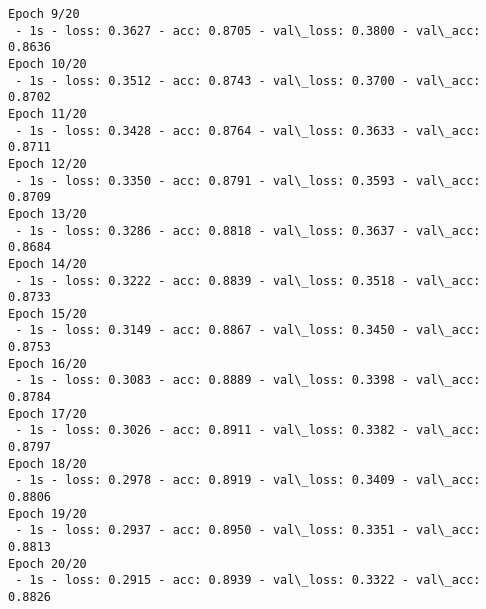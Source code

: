 \documentclass[11pt]{article}
\begin{document}
\begin{Verbatim}[commandchars=\\\{\}]
Epoch 9/20
 - 1s - loss: 0.3627 - acc: 0.8705 - val\_loss: 0.3800 - val\_acc: 0.8636
Epoch 10/20
 - 1s - loss: 0.3512 - acc: 0.8743 - val\_loss: 0.3700 - val\_acc: 0.8702
Epoch 11/20
 - 1s - loss: 0.3428 - acc: 0.8764 - val\_loss: 0.3633 - val\_acc: 0.8711
Epoch 12/20
 - 1s - loss: 0.3350 - acc: 0.8791 - val\_loss: 0.3593 - val\_acc: 0.8709
Epoch 13/20
 - 1s - loss: 0.3286 - acc: 0.8818 - val\_loss: 0.3637 - val\_acc: 0.8684
Epoch 14/20
 - 1s - loss: 0.3222 - acc: 0.8839 - val\_loss: 0.3518 - val\_acc: 0.8733
Epoch 15/20
 - 1s - loss: 0.3149 - acc: 0.8867 - val\_loss: 0.3450 - val\_acc: 0.8753
Epoch 16/20
 - 1s - loss: 0.3083 - acc: 0.8889 - val\_loss: 0.3398 - val\_acc: 0.8784
Epoch 17/20
 - 1s - loss: 0.3026 - acc: 0.8911 - val\_loss: 0.3382 - val\_acc: 0.8797
Epoch 18/20
 - 1s - loss: 0.2978 - acc: 0.8919 - val\_loss: 0.3409 - val\_acc: 0.8806
Epoch 19/20
 - 1s - loss: 0.2937 - acc: 0.8950 - val\_loss: 0.3351 - val\_acc: 0.8813
Epoch 20/20
 - 1s - loss: 0.2915 - acc: 0.8939 - val\_loss: 0.3322 - val\_acc: 0.8826

    \end{Verbatim}
\end{document}
